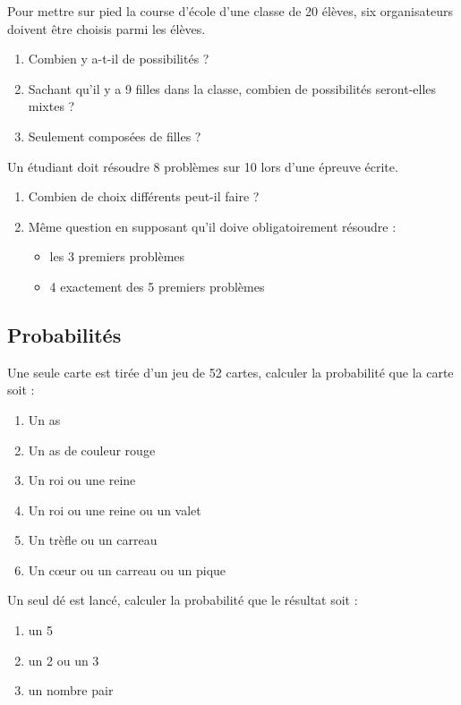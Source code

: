 \begin{exercice}
Pour mettre sur pied la course d'école d'une classe de 20 élèves, six organisateurs doivent être choisis parmi les élèves.
\begin{enumerate}
\item Combien y a-t-il de possibilités ?
\item Sachant qu'il y a 9 filles dans la classe, combien de possibilités seront-elles mixtes ?
\item Seulement composées de filles ?
\end{enumerate}
\end{exercice}

\begin{exercice}
Un étudiant doit résoudre 8 problèmes sur 10 lors d'une épreuve écrite.
\begin{enumerate}
\item Combien de choix différents peut-il faire ?
\item Même question en supposant qu'il doive obligatoirement résoudre :
\begin{itemize}
\item les 3 premiers problèmes
\item 4 exactement des 5 premiers problèmes
\end{itemize}
\end{enumerate}
\end{exercice}

\subsection{Probabilités}


\begin{exercice}Une seule carte est tirée d’un jeu de 52 cartes, calculer la probabilité que la carte soit :
\begin{enumerate}
\item Un as
\item Un as de couleur rouge
\item Un roi ou une reine
\item Un roi ou une reine ou un valet
\item Un trèfle ou un carreau
\item Un cœur ou un carreau ou un pique
\end{enumerate}
\end{exercice}

\begin{exercice}
Un seul dé est lancé, calculer la probabilité que le résultat soit :
\begin{enumerate}
\item un 5
\item un 2 ou un 3
\item un nombre pair
\end{enumerate}
\end{exercice}

